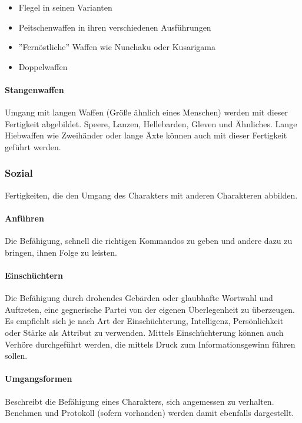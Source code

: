 \documentclass{article}
\begin{document}
\begin{itemize}
\item Flegel in seinen Varianten
\item Peitschenwaffen in ihren verschiedenen Ausführungen
\item ''Fernöstliche'' Waffen wie Nunchaku oder Kusarigama
\item Doppelwaffen
\end{itemize}

\paragraph{Stangenwaffen}

Umgang mit langen Waffen (Größe ähnlich eines Menschen) werden mit dieser Fertigkeit abgebildet. Speere, Lanzen,
Hellebarden, Gleven und Ähnliches. Lange Hiebwaffen wie Zweihänder oder lange Äxte können auch mit dieser Fertigkeit
geführt werden.

\subsubsection{Sozial}

Fertigkeiten, die den Umgang des Charakters mit anderen Charakteren abbilden.

\paragraph{Anführen}

Die Befähigung, schnell die richtigen Kommandos zu geben und andere dazu zu bringen, ihnen Folge zu leisten.

\paragraph{Einschüchtern}

Die Befähigung durch drohendes Gebärden oder glaubhafte Wortwahl und Auftreten, eine gegnerische Partei von der
eigenen Überlegenheit zu überzeugen. Es empfiehlt sich je nach Art der Einschüchterung, Intelligenz, Persönlichkeit
oder Stärke als Attribut zu verwenden. Mittels Einschüchterung können auch Verhöre durchgeführt werden, die mittels
Druck zum Informationsgewinn führen sollen.

\paragraph{Umgangsformen}

Beschreibt die Befähigung eines Charakters, sich angemessen zu verhalten. Benehmen und Protokoll (sofern vorhanden)
werden damit ebenfalls dargestellt.
\end{document}
